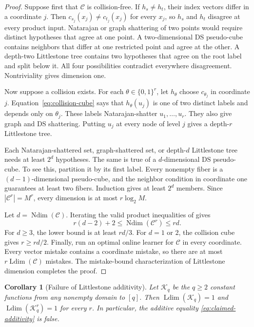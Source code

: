 \documentclass[twoside]{article}
\newtheorem{corollary}[theorem]{Corollary}
\newcommand{\C}{\mathcal C}
\newcommand{\Ldim}{\operatorname{Ldim}}
\newcommand{\Ndim}{\operatorname{Ndim}}
\begin{document}
\begin{proof}
Suppose first that $\C$ is collision-free. If $h_s\neq h_t$, their index vectors differ in a coordinate $j$. Then $c_{s_j}(x_j)\neq c_{t_j}(x_j)$ for every $x_j$, so $h_s$ and $h_t$ disagree at every product input. Natarajan or graph shattering of two points would require distinct hypotheses that agree at one point. A two-dimensional DS pseudo-cube contains neighbors that differ at one restricted point and agree at the other. A depth-two Littlestone tree contains two hypotheses that agree on the root label and split below it. All four possibilities contradict everywhere disagreement. Nontriviality gives dimension one.

Now suppose a collision exists. For each $\theta\in\{0,1\}^r$, let $h_\theta$ choose $c_{\theta_j}$ in coordinate $j$. Equation~\eqref{eq:collision-cube} says that $h_\theta(u_j)$ is one of two distinct labels and depends only on $\theta_j$. These labels Natarajan-shatter $u_1,\ldots,u_r$. They also give graph and DS shattering. Putting $u_j$ at every node of level $j$ gives a depth-$r$ Littlestone tree.

Each Natarajan-shattered set, graph-shattered set, or depth-$d$ Littlestone tree needs at least $2^d$ hypotheses. The same is true of a $d$-dimensional DS pseudo-cube. To see this, partition it by its first label. Every nonempty fiber is a $(d-1)$-dimensional pseudo-cube, and the neighbor condition in coordinate one guarantees at least two fibers. Induction gives at least $2^d$ members. Since $|\C^r|=M^r$, every dimension is at most $r\log_2M$.

Let $d=\Ndim(\C)$. Iterating the valid product inequalities of \citet{hanneke2024list} gives
\[
 r(d-2)+2\leq\Ndim(\C^r)\leq rd.
\]
For $d\geq3$, the lower bound is at least $rd/3$. For $d=1$ or $2$, the collision cube gives $r\geq rd/2$. Finally, run an optimal online learner for $\C$ in every coordinate. Every vector mistake contains a coordinate mistake, so there are at most $r\Ldim(\C)$ mistakes. The mistake-bound characterization of Littlestone dimension completes the proof.
\end{proof}

\begin{corollary}[Failure of Littlestone additivity]
\label{cor:littlestone}
Let $\mathcal K_q$ be the $q\geq2$ constant functions from any nonempty domain to $[q]$. Then $\Ldim(\mathcal K_q)=1$ and $\Ldim(\mathcal K_q^r)=1$ for every $r$. In particular, the additive equality \eqref{eq:claimed-additivity} is false.
\end{corollary}
\end{document}
